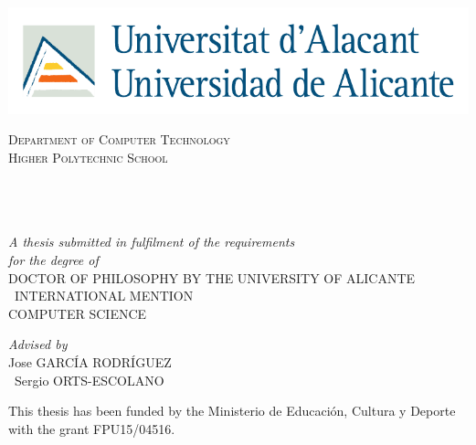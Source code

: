 \begin{titlepage}
\begin{center}
	
\includegraphics[width=0.64\linewidth]{Figures/logoua}

\vfill

\textsc{\LARGE Department of Computer Technology}\\[1.5cm] %
\textsc{\Large Higher Polytechnic School}\\[0.5cm] %

{\huge \bfseries \ttitle}\\[0.4cm] %
 
\begin{center} \large
{\authorname} %
\\\ \\
\emph{A thesis submitted in fulfilment of the requirements\\ for the degree of } \\
{DOCTOR OF PHILOSOPHY BY THE UNIVERSITY OF ALICANTE}\\\
{INTERNATIONAL MENTION}\\
{COMPUTER SCIENCE}\\
\end{center}

\vfill
 
\large \textit{Advised by}\\[0.3cm] %
{Jose GARCÍA RODRÍGUEZ}\\\
{Sergio ORTS-ESCOLANO}\\
 
 \vfill
 
{\large This thesis has been funded by the Ministerio de Educación, Cultura y Deporte with the grant FPU15/04516.}\\[4cm] %
 
\end{center}
\end{titlepage}
